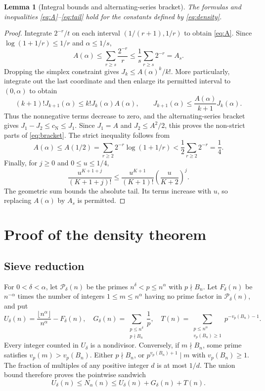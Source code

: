 \documentclass[10pt]{article}
\newtheorem{lemma}[theorem]{Lemma}
\theoremstyle{remark}
\newcommand{\cn}{c_{\mathrm N}}
\begin{document}
\begin{lemma}[Integral bounds and alternating-series bracket]
\label{lem:alternating}
The formulas and inequalities \eqref{eq:A}--\eqref{eq:tail} hold for
the constants defined by \eqref{eq:density}.
\end{lemma}
\begin{proof}
Integrate $2^{-r}/t$ on each interval $(1/(r+1),1/r)$ to obtain
\eqref{eq:A}. Since $\log(1+1/r)\leq1/r$ and $\alpha\leq1/s$,
\[
 A(\alpha)\leq\sum_{r\geq s}\frac{2^{-r}}r
 \leq\frac1s\sum_{r\geq s}2^{-r}=A_s.
\]
Dropping the simplex constraint gives $J_k\leq A(\alpha)^k/k!$.
More particularly, integrate out the last coordinate and then enlarge
its permitted interval to $(0,\alpha)$ to obtain
\begin{equation}\label{eq:successive}
 (k+1)!J_{k+1}(\alpha)
 \leq k!J_k(\alpha)A(\alpha),\qquad
 J_{k+1}(\alpha)\leq\frac{A(\alpha)}{k+1}J_k(\alpha).
\end{equation}
Thus the nonnegative terms decrease to zero, and the alternating-series
bracket gives $J_1-J_2\leq\cn\leq J_1$. Since $J_1=A$ and $J_2\leq
A^2/2$, this proves the non-strict parts of \eqref{eq:bracket}.
The strict inequality follows from
\[
 A(\alpha)\leq A(1/2)=\sum_{r\geq2}2^{-r}\log(1+1/r)
 <\frac12\sum_{r\geq2}2^{-r}=\frac14.
\]
Finally, for $j\geq0$ and $0\leq u\leq1/4$,
\[
 \frac{u^{K+1+j}}{(K+1+j)!}
 \leq\frac{u^{K+1}}{(K+1)!}\left(\frac{u}{K+2}\right)^j.
\]
The geometric sum bounds the absolute tail. Its terms increase with
$u$, so replacing $A(\alpha)$ by $A_s$ is permitted.
\end{proof}

\section{Proof of the density theorem}\label{sec:proof}
\subsection{Sieve reduction}
For $0<\delta<\alpha$, let $\mathcal P_\delta(n)$ be the primes
$n^\delta<p\leq n^\alpha$ with $p\nmid B_n$. Let $F_\delta(n)$ be
$n^{-\alpha}$ times the number of integers $1\leq m\leq n^\alpha$
having no prime factor in $\mathcal P_\delta(n)$, and put
\[
 U_\delta(n)=\frac{\lfloor n^\alpha\rfloor}{n^\alpha}-F_\delta(n),
 \quad
 G_\delta(n)=\sum_{\substack{p\leq n^\delta\\p\nmid B_n}}\frac1p,
 \quad
 T(n)=\sum_{\substack{p\leq n^\alpha\\v_p(B_n)\geq1}}
                  p^{-v_p(B_n)-1}.
\]
Every integer counted in $U_\delta$ is a nondivisor. Conversely, if
$m\nmid B_n$, some prime satisfies $v_p(m)>v_p(B_n)$. Either $p\nmid
B_n$, or $p^{v_p(B_n)+1}\mid m$ with $v_p(B_n)\geq1$.
The fraction of multiples of any positive integer $d$ is at most $1/d$.
The union bound therefore proves the pointwise sandwich
\begin{equation}\label{eq:sandwich}
 U_\delta(n)\leq N_\alpha(n)
 \leq U_\delta(n)+G_\delta(n)+T(n).
\end{equation}
\end{document}
